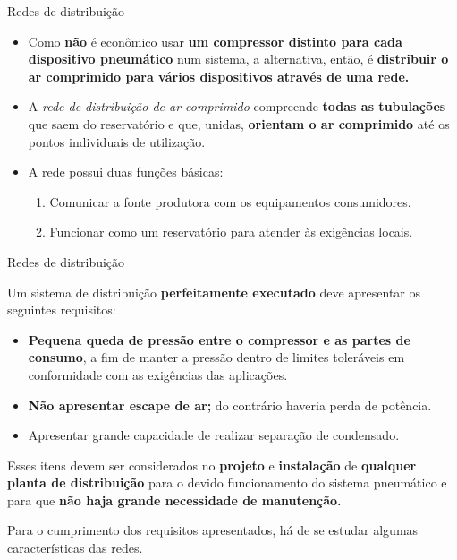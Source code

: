 \begin{frame}{Redes de distribuição}
	\begin{block}{}
		\begin{itemize}
			\item Como \textbf{não} é econômico usar \textbf{um compressor distinto para cada dispositivo pneumático} num sistema, a alternativa, então, é \textbf{distribuir o ar comprimido para vários dispositivos através de uma rede.}
			\item A \textit{rede de distribuição de ar comprimido }compreende \textbf{todas as tubulações} que saem do reservatório e que, unidas, \textbf{orientam o ar comprimido} até os pontos individuais de utilização.
			\item A rede possui duas funções básicas:
			\begin{enumerate}
				\item Comunicar a fonte produtora com os equipamentos
				consumidores.
				\item Funcionar como um reservatório para atender às exigências locais.
			\end{enumerate}
		\end{itemize}
	\end{block}
\end{frame}


\begin{frame}{Redes de distribuição}
	\begin{block}{}
		Um sistema de distribuição \textbf{perfeitamente executado} deve
		apresentar os seguintes requisitos:
		
		\begin{itemize}
			\item \textbf{Pequena queda de pressão entre o compressor e as partes de consumo}, a fim de manter a pressão dentro de limites toleráveis em conformidade com as exigências das aplicações.
			\item \textbf{Não apresentar escape de ar;} do contrário haveria perda de potência.
			\item Apresentar grande capacidade de realizar separação de condensado.
		\end{itemize}
	
		Esses itens devem ser considerados no \textbf{projeto} e \textbf{instalação} de \textbf{qualquer planta de distribuição} para o devido funcionamento do sistema pneumático e para que \textbf{não haja grande necessidade de manutenção.}
		
		\smallskip
		
		Para o cumprimento dos requisitos apresentados, há de se estudar algumas características das redes.
	\end{block}
\end{frame}



